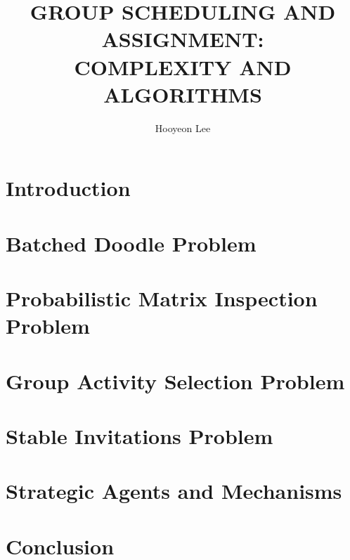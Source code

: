 \documentclass[11pt]{report}
\theoremstyle{plain}
\theoremstyle{definition}
\begin{document}
\title{GROUP SCHEDULING AND ASSIGNMENT: \\
COMPLEXITY AND ALGORITHMS}
\author{Hooyeon Lee}

 
\beforepreface
{}





\afterpreface

\chapter{Introduction}


\chapter{Batched Doodle Problem}


\chapter{Probabilistic Matrix Inspection Problem}


\chapter{Group Activity Selection Problem}


\chapter{Stable Invitations Problem}


\chapter{Strategic Agents and Mechanisms}


\chapter{Conclusion}






\end{document}
